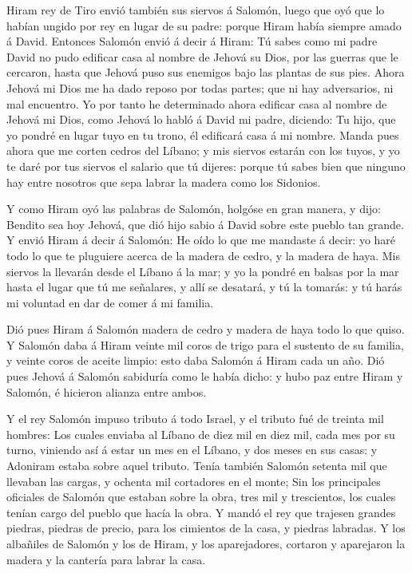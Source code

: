  Hiram rey de Tiro envió también sus siervos á Salomón,
luego que oyó que lo habían ungido por rey en lugar de su padre: porque
Hiram había siempre amado á David.  Entonces Salomón envió á
decir á Hiram:  Tú sabes como mi padre David no pudo
edificar casa al nombre de Jehová su Dios, por las guerras que le
cercaron, hasta que Jehová puso sus enemigos bajo las plantas de sus
pies.  Ahora Jehová mi Dios me ha dado reposo por todas
partes; que ni hay adversarios, ni mal encuentro.  Yo por
tanto he determinado ahora edificar casa al nombre de Jehová mi Dios,
como Jehová lo habló á David mi padre, diciendo: Tu hijo, que yo pondré
en lugar tuyo en tu trono, él edificará casa á mi nombre. 
Manda pues ahora que me corten cedros del Líbano; y mis siervos estarán
con los tuyos, y yo te daré por tus siervos el salario que tú dijeres:
porque tú sabes bien que ninguno hay entre nosotros que sepa labrar la
madera como los Sidonios.

 Y como Hiram oyó las palabras de Salomón, holgóse en gran
manera, y dijo: Bendito sea hoy Jehová, que dió hijo sabio á David sobre
este pueblo tan grande.  Y envió Hiram á decir á Salomón: He
oído lo que me mandaste á decir: yo haré todo lo que te pluguiere acerca
de la madera de cedro, y la madera de haya.  Mis siervos la
llevarán desde el Líbano á la mar; y yo la pondré en balsas por la mar
hasta el lugar que tú me señalares, y allí se desatará, y tú la tomarás:
y tú harás mi voluntad en dar de comer á mi familia.

 Dió pues Hiram á Salomón madera de cedro y madera de haya
todo lo que quiso.  Y Salomón daba á Hiram veinte mil coros
de trigo para el sustento de su familia, y veinte coros de aceite
limpio: esto daba Salomón á Hiram cada un año.  Dió pues
Jehová á Salomón sabiduría como le había dicho: y hubo paz entre Hiram y
Salomón, é hicieron alianza entre ambos.

 Y el rey Salomón impuso tributo á todo Israel, y el
tributo fué de treinta mil hombres:  Los cuales enviaba al
Líbano de diez mil en diez mil, cada mes por su turno, viniendo así á
estar un mes en el Líbano, y dos meses en sus casas: y Adoniram estaba
sobre aquel tributo.  Tenía también Salomón setenta mil que
llevaban las cargas, y ochenta mil cortadores en el monte; 
Sin los principales oficiales de Salomón que estaban sobre la obra, tres
mil y trescientos, los cuales tenían cargo del pueblo que hacía la obra.
 Y mandó el rey que trajesen grandes piedras, piedras de
precio, para los cimientos de la casa, y piedras labradas. 
Y los albañiles de Salomón y los de Hiram, y los aparejadores, cortaron
y aparejaron la madera y la cantería para labrar la casa.

